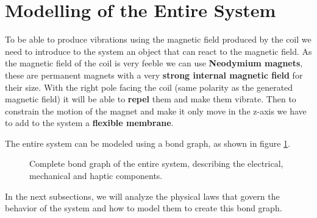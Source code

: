 \section{Modelling of the Entire System}
To be able to produce vibrations using the magnetic field produced by the coil we need to introduce to the system an object that can react to the magnetic field. As the magnetic field of the coil is very feeble we can use \textbf{Neodymium magnets}, these are permanent magnets with a very \textbf{strong internal magnetic field} for their size.
With the right pole facing the coil (same polarity as the generated magnetic field) it will be able to \textbf{repel} them and make them vibrate.
Then to constrain the motion of the magnet and make it only move in the z-axis we have to add to the system a \textbf{flexible membrane}.

\begin{samepage}
    The entire system can be modeled using a bond graph, as shown in figure \ref{fig: Total_bond-graph}.
    \nopagebreak

    \begin{figure}[H]
        \centering
        \resizebox{1\linewidth}{!}{
            
        } %
        \caption[System bond-graph]{Complete bond graph of the entire system, describing the electrical, mechanical and haptic components.}
        \label{fig: Total_bond-graph}
    \end{figure}
\end{samepage}

In the next subsections, we will analyze the physical laws that govern the behavior of the system and how to model them to create this bond graph.







